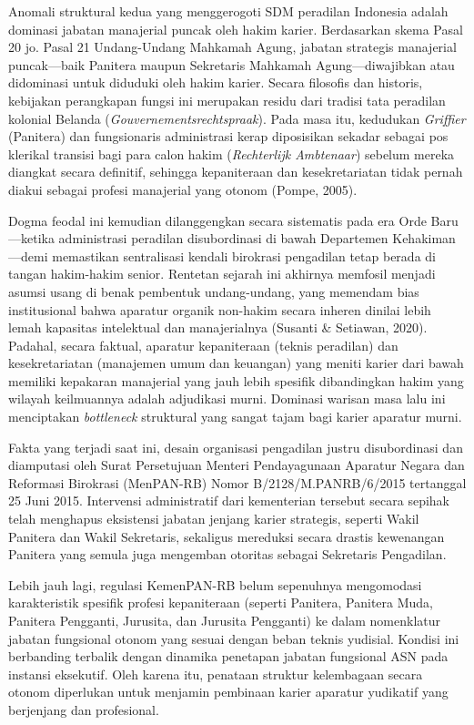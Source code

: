 \documentclass[12pt, a4paper]{article}
\begin{document}
Anomali struktural kedua yang menggerogoti SDM peradilan Indonesia adalah dominasi jabatan manajerial puncak oleh hakim karier. Berdasarkan skema Pasal 20 jo. Pasal 21 Undang-Undang Mahkamah Agung, jabatan strategis manajerial puncak—baik Panitera maupun Sekretaris Mahkamah Agung—diwajibkan atau didominasi untuk diduduki oleh hakim karier. Secara filosofis dan historis, kebijakan perangkapan fungsi ini merupakan residu dari tradisi tata peradilan kolonial Belanda (\textit{Gouvernementsrechtspraak}). Pada masa itu, kedudukan \textit{Griffier} (Panitera) dan fungsionaris administrasi kerap diposisikan sekadar sebagai pos klerikal transisi bagi para calon hakim (\textit{Rechterlijk Ambtenaar}) sebelum mereka diangkat secara definitif, sehingga kepaniteraan dan kesekretariatan tidak pernah diakui sebagai profesi manajerial yang otonom (Pompe, 2005). 

Dogma feodal ini kemudian dilanggengkan secara sistematis pada era Orde Baru—ketika administrasi peradilan disubordinasi di bawah Departemen Kehakiman—demi memastikan sentralisasi kendali birokrasi pengadilan tetap berada di tangan hakim-hakim senior. Rentetan sejarah ini akhirnya memfosil menjadi asumsi usang di benak pembentuk undang-undang, yang memendam bias institusional bahwa aparatur organik non-hakim secara inheren dinilai lebih lemah kapasitas intelektual dan manajerialnya (Susanti \& Setiawan, 2020). Padahal, secara faktual, aparatur kepaniteraan (teknis peradilan) dan kesekretariatan (manajemen umum dan keuangan) yang meniti karier dari bawah memiliki kepakaran manajerial yang jauh lebih spesifik dibandingkan hakim yang wilayah keilmuannya adalah adjudikasi murni. Dominasi warisan masa lalu ini menciptakan \textit{bottleneck} struktural yang sangat tajam bagi karier aparatur murni.

Fakta yang terjadi saat ini, desain organisasi pengadilan justru disubordinasi dan diamputasi oleh Surat Persetujuan Menteri Pendayagunaan Aparatur Negara dan Reformasi Birokrasi (Men\-PAN-RB) Nomor B\slash 2128\slash M.PANRB\slash 6\slash 2015 tertanggal 25 Juni 2015. Intervensi administratif dari kementerian tersebut secara sepihak telah menghapus eksistensi jabatan jenjang karier strategis, seperti Wakil Panitera dan Wakil Sekretaris, sekaligus mereduksi secara drastis kewenangan Panitera yang semula juga mengemban otoritas sebagai Sekretaris Pengadilan. 

Lebih jauh lagi, regulasi KemenPAN-RB belum sepenuhnya mengomodasi karakteristik spesifik profesi kepaniteraan (seperti Panitera, Panitera Muda, Panitera Pengganti, Jurusita, dan Jurusita Pengganti) ke dalam nomenklatur jabatan fungsional otonom yang sesuai dengan beban teknis yudisial. Kondisi ini berbanding terbalik dengan dinamika penetapan jabatan fungsional ASN pada instansi eksekutif. Oleh karena itu, penataan struktur kelembagaan secara otonom diperlukan untuk menjamin pembinaan karier aparatur yudikatif yang berjenjang dan profesional.
\end{document}
